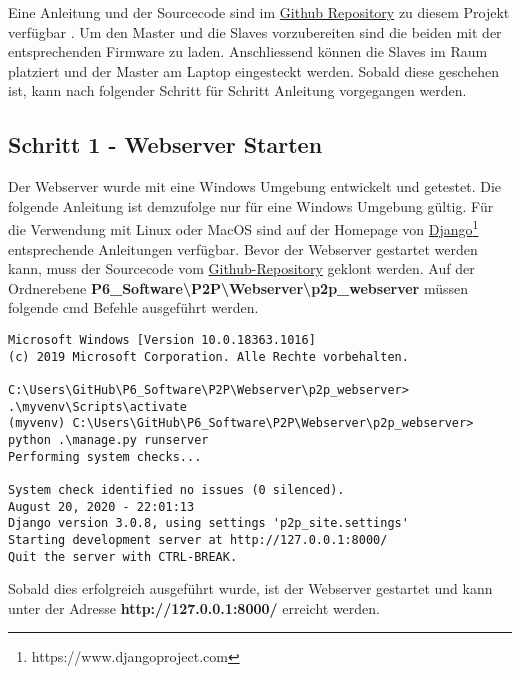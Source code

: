 Eine Anleitung und der Sourcecode sind im \href{https://github.com/Rouben94/P6_Software}{Github Repository\footnotemark[\value{footnote}]} zu diesem Projekt verfügbar \cite{github_p6_software_p2p_2020}.
Um den Master und die Slaves vorzubereiten sind die beiden mit der entsprechenden Firmware zu laden.
Anschliessend können die Slaves im Raum platziert und der Master am Laptop eingesteckt werden.
Sobald diese geschehen ist, kann nach folgender Schritt für Schritt Anleitung vorgegangen werden.

\subsection{Schritt 1 - Webserver Starten}\label{sec:SchrittWebserverStarten}
Der Webserver wurde mit eine Windows Umgebung entwickelt und getestet. Die folgende Anleitung ist demzufolge nur für eine Windows Umgebung gültig.
Für die Verwendung mit Linux oder MacOS sind auf der Homepage von \href{https://www.djangoproject.com/}{Django\footnote{\url{https://www.djangoproject.com}}} entsprechende Anleitungen verfügbar.
Bevor der Webserver gestartet werden kann, muss der Sourcecode vom \href{https://github.com/Rouben94/P6_Software}{Github-Repository\footnotemark[\value{footnote}]} geklont werden.
Auf der Ordnerebene \textbf{P6\_Software\textbackslash P2P\textbackslash Webserver\textbackslash p2p\_webserver} müssen folgende cmd Befehle ausgeführt werden.



\begin{lstlisting}[style=DOS]
Microsoft Windows [Version 10.0.18363.1016]
(c) 2019 Microsoft Corporation. Alle Rechte vorbehalten.

C:\Users\GitHub\P6_Software\P2P\Webserver\p2p_webserver> .\myvenv\Scripts\activate
(myvenv) C:\Users\GitHub\P6_Software\P2P\Webserver\p2p_webserver> python .\manage.py runserver
Performing system checks...
	
System check identified no issues (0 silenced).
August 20, 2020 - 22:01:13
Django version 3.0.8, using settings 'p2p_site.settings'
Starting development server at http://127.0.0.1:8000/   
Quit the server with CTRL-BREAK.
\end{lstlisting}

Sobald dies erfolgreich ausgeführt wurde, ist der Webserver gestartet und kann unter der Adresse \textbf{http://127.0.0.1:8000/} erreicht werden.

